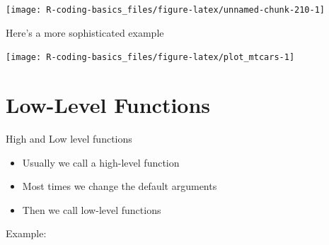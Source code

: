 \documentclass[
]{book}
\newenvironment{Shaded}{\begin{snugshade}}{\end{snugshade}}
\newcommand{\AttributeTok}[1]{\textcolor[rgb]{0.77,0.63,0.00}{#1}}
\newcommand{\CommentTok}[1]{\textcolor[rgb]{0.56,0.35,0.01}{\textit{#1}}}
\newcommand{\DecValTok}[1]{\textcolor[rgb]{0.00,0.00,0.81}{#1}}
\newcommand{\FloatTok}[1]{\textcolor[rgb]{0.00,0.00,0.81}{#1}}
\newcommand{\FunctionTok}[1]{\textcolor[rgb]{0.00,0.00,0.00}{#1}}
\newcommand{\NormalTok}[1]{#1}
\newcommand{\SpecialCharTok}[1]{\textcolor[rgb]{0.00,0.00,0.00}{#1}}
\newcommand{\StringTok}[1]{\textcolor[rgb]{0.31,0.60,0.02}{#1}}
\begin{document}
\begin{center}\texttt{[image: R-coding-basics\_files/figure-latex/unnamed-chunk-210-1]} \end{center}

Here's a more sophisticated example

\begin{Shaded}
\end{Shaded}

\begin{center}\texttt{[image: R-coding-basics\_files/figure-latex/plot\_mtcars-1]} \end{center}

\hypertarget{low-level-functions}{%
\section{Low-Level Functions}\label{low-level-functions}}

High and Low level functions

\begin{itemize}
\item
  Usually we call a high-level function
\item
  Most times we change the default arguments
\item
  Then we call low-level functions
\end{itemize}

Example:
\end{document}
